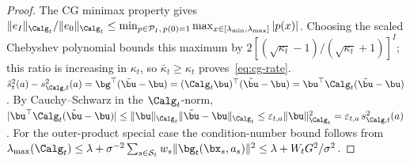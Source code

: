 \begin{proof}
The CG minimax property gives
$\|e_I\|_{\Calg_t}/\|e_0\|_{\Calg_t}
\le\min_{p\in\mathcal P_I,\,p(0)=1}
\max_{x\in[\lambda_{\min},\lambda_{\max}]}|p(x)|$.
Choosing the scaled Chebyshev polynomial bounds this maximum by
$2[(\sqrt{\kappa_t}-1)/(\sqrt{\kappa_t}+1)]^I$; this ratio is increasing in
$\kappa_t$, so $\bar\kappa_t\ge\kappa_t$ proves~\eqref{eq:cg-rate}.
$\tilde{s}_t^2(a) - s_{\Calg,t}^2(a)
= \bg^\top(\tilde\bu-\bu)
= (\Calg_t\bu)^\top(\tilde\bu-\bu)
= \bu^\top\Calg_t(\tilde\bu-\bu)$.
By Cauchy--Schwarz in the $\Calg_t$-norm,
$|\bu^\top\Calg_t(\tilde\bu-\bu)|
\le\|\bu\|_{\Calg_t}\|\tilde\bu-\bu\|_{\Calg_t}
\le\varepsilon_{t,a}\|\bu\|_{\Calg_t}^2 = \varepsilon_{t,a}\,s_{\Calg,t}^2(a)$.
For the outer-product special case the condition-number bound follows from
$\lambda_{\max}(\Calg_t)\le\lambda+\sigma^{-2}\sum_{s\in\mathcal{S}_t} w_s\|\bg_t(\bx_s,a_s)\|^2
\le\lambda+W_tG^2/\sigma^2$.
\end{proof}

